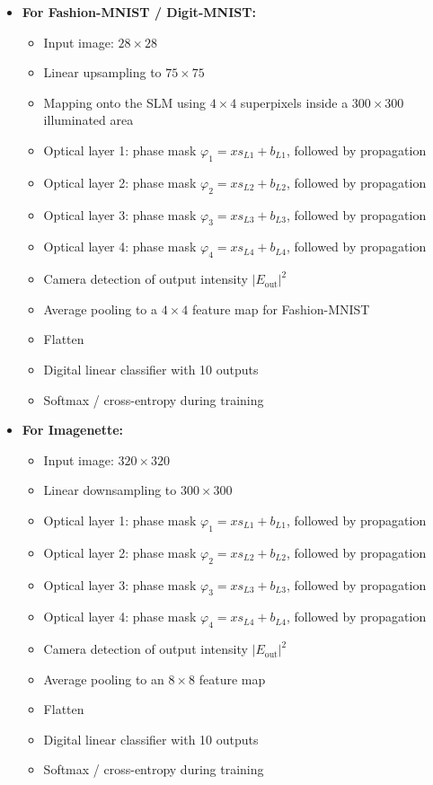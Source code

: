 \documentclass[aps, prb, superscriptaddress, longbibliography]{revtex4-2}
\renewcommand{\phi}{\varphi}
\numberwithin{equation}{section}
\begin{document}
\begin{itemize}
    \item \textbf{For Fashion-MNIST / Digit-MNIST:}
    \begin{itemize}
        \item Input image: $28 \times 28$
        \item Linear upsampling to $75 \times 75$
        \item Mapping onto the SLM using $4 \times 4$ superpixels inside a $300 \times 300$ illuminated area
        \item Optical layer 1: phase mask $\phi_1 = x s_{L1} + b_{L1}$, followed by propagation
        \item Optical layer 2: phase mask $\phi_2 = x s_{L2} + b_{L2}$, followed by propagation
        \item Optical layer 3: phase mask $\phi_3 = x s_{L3} + b_{L3}$, followed by propagation
        \item Optical layer 4: phase mask $\phi_4 = x s_{L4} + b_{L4}$, followed by propagation
        \item Camera detection of output intensity $|E_{\mathrm{out}}|^2$
        \item Average pooling to a $4 \times 4$ feature map for Fashion-MNIST
        \item Flatten
        \item Digital linear classifier with 10 outputs
        \item Softmax / cross-entropy during training
    \end{itemize}

    \item \textbf{For Imagenette:}
    \begin{itemize}
        \item Input image: $320 \times 320$
        \item Linear downsampling to $300 \times 300$
        \item Optical layer 1: phase mask $\phi_1 = x s_{L1} + b_{L1}$, followed by propagation
        \item Optical layer 2: phase mask $\phi_2 = x s_{L2} + b_{L2}$, followed by propagation
        \item Optical layer 3: phase mask $\phi_3 = x s_{L3} + b_{L3}$, followed by propagation
        \item Optical layer 4: phase mask $\phi_4 = x s_{L4} + b_{L4}$, followed by propagation
        \item Camera detection of output intensity $|E_{\mathrm{out}}|^2$
        \item Average pooling to an $8 \times 8$ feature map
        \item Flatten
        \item Digital linear classifier with 10 outputs
        \item Softmax / cross-entropy during training
    \end{itemize}
\end{itemize}
\end{document}
